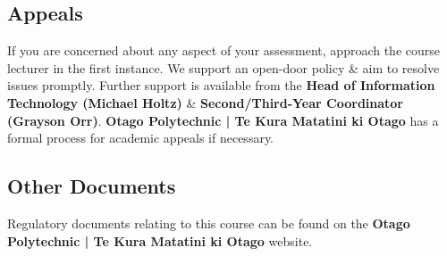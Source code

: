 \documentclass{article}
\begin{document}
\subsection*{Appeals}
If you are concerned about any aspect of your assessment, approach the course lecturer in the first instance. We support an open-door policy \& aim to resolve issues promptly. Further support is available from the \textbf{Head of Information Technology (Michael Holtz)} \& \textbf{Second/Third-Year Coordinator (Grayson Orr)}. \textbf{Otago Polytechnic | Te Kura Matatini ki Otago} has a formal process for academic appeals if necessary.

\subsection*{Other Documents}
Regulatory documents relating to this course can be found on the \textbf{Otago Polytechnic | Te Kura Matatini ki Otago} website.
\end{document}
